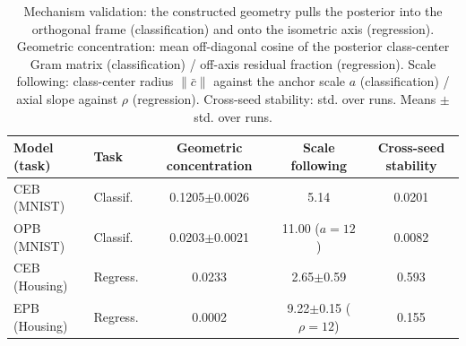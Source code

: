 \begin{table}[t]
\centering
\caption{Mechanism validation: the constructed geometry pulls the posterior into the orthogonal frame (classification) and onto the isometric axis (regression). Geometric concentration: mean off-diagonal cosine of the posterior class-center Gram matrix (classification) / off-axis residual fraction (regression). Scale following: class-center radius $\lVert\bar c\rVert$ against the anchor scale $a$ (classification) / axial slope against $\rho$ (regression). Cross-seed stability: std. over runs. Means $\pm$ std. over runs.}
\label{tab:mechanism}
\small
{
\setlength{\tabcolsep}{4pt}
\begin{tabular}{l l c c c}
\hline
Model (task) & Task & Geometric concentration & Scale following & Cross-seed stability \\
\hline
CEB (MNIST) & Classif. & 0.1205$\pm$0.0026 & 5.14 & 0.0201 \\
OPB (MNIST) & Classif. & 0.0203$\pm$0.0021 & 11.00 ($a=12$) & 0.0082 \\
CEB (Housing) & Regress. & 0.0233 & 2.65$\pm$0.59 & 0.593 \\
EPB (Housing) & Regress. & 0.0002 & 9.22$\pm$0.15 ($\rho=12$) & 0.155 \\
\hline
\end{tabular}
}
\end{table}
